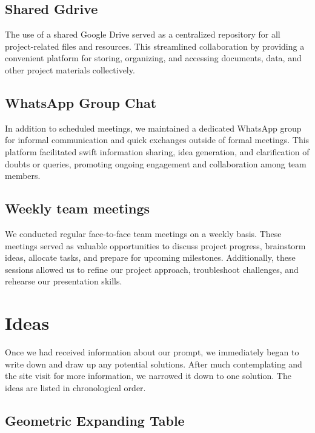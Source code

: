 \documentclass[a4paper,10pt]{article}
\begin{document}
\subsection{Shared Gdrive}
The use of a shared Google Drive served as a centralized repository for all project-related files and resources. This streamlined collaboration by providing a convenient platform for storing, organizing, and accessing documents, data, and other project materials collectively.

\subsection{WhatsApp Group Chat}
 In addition to scheduled meetings, we maintained a dedicated WhatsApp group for informal communication and quick exchanges outside of formal meetings. This platform facilitated swift information sharing, idea generation, and clarification of doubts or queries, promoting ongoing engagement and collaboration among team members.

\subsection{Weekly team meetings}
We conducted regular face-to-face team meetings on a weekly basis. These meetings served as valuable opportunities to discuss project progress, brainstorm ideas, allocate tasks, and prepare for upcoming milestones. Additionally, these sessions allowed us to refine our project approach, troubleshoot challenges, and rehearse our presentation skills.




\section{Ideas}
Once we had received information about our prompt, we immediately began to write down and draw up any potential solutions. After much contemplating and the site visit for more information, we narrowed it down to one solution. The ideas are listed in chronological order.

\subsection{Geometric Expanding Table}
\end{document}
